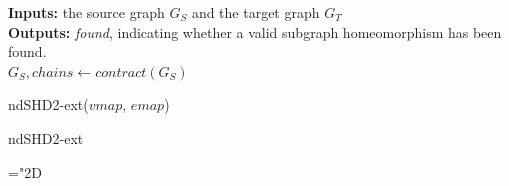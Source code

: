 \begin{Algorithm}{20cm}
\SetAlgoLined
\LinesNumbered
\textbf{Inputs: } the source graph $G_S$ and the target graph $G_T$\\
\textbf{Outputs: } \textit{found}, indicating whether a valid subgraph homeomorphism has been found.\\
\color{purple}
 {
	$G_S, \mathit{chains} \longleftarrow \mathit{contract}(G_S)$ \color{black}\color{purple}
}
\color{black}

 \Return ndSHD2{\color{purple}-ext}($\mathit{vmap}$, $\mathit{emap}$)\tcp*[h]{\ref{algorithm:ndSHD2-ext}}\;
 \caption{ndSHD2-ext}
 \label{algorithm:ndSHD2-prune}
\end{Algorithm}

\mathchardef\mhyphen="2D %

